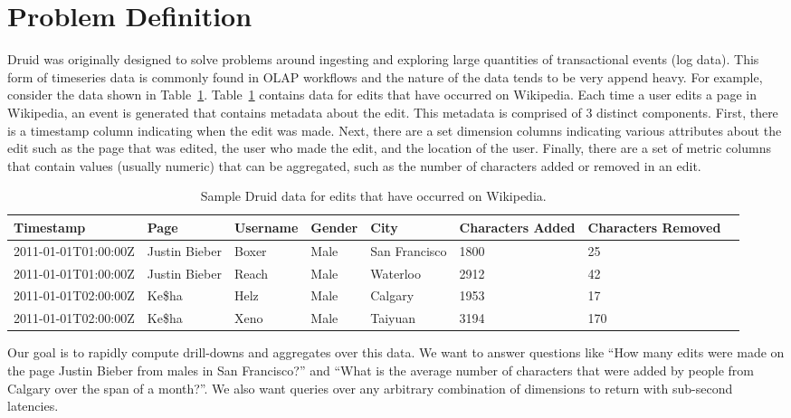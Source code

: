 \documentclass{acm_proc_article-sp}
\begin{document}
\section{Problem Definition}
\label{sec:problem-definition}

Druid was originally designed to solve problems around ingesting and exploring
large quantities of transactional events (log data). This form of timeseries
data is commonly found in OLAP workflows and the nature of the data tends to be
very append heavy. For example, consider the data shown in
Table~\ref{tab:sample_data}.  Table~\ref{tab:sample_data} contains data for
edits that have occurred on Wikipedia. Each time a user edits a page in
Wikipedia, an event is generated that contains metadata about the edit. This
metadata is comprised of 3 distinct components. First, there is a timestamp
column indicating when the edit was made. Next, there are a set dimension
columns indicating various attributes about the edit such as the page that was
edited, the user who made the edit, and the location of the user. Finally,
there are a set of metric columns that contain values (usually numeric) that
can be aggregated, such as the number of characters added or removed in an
edit. 

\begin{table}
  \centering
  \label{tab:sample_data}
  \begin{tabular}{| l | l | l | l | l | l | l | l |}
    \hline
    \textbf{Timestamp} & \textbf{Page} & \textbf{Username} & \textbf{Gender} & \textbf{City} & \textbf{Characters Added} & \textbf{Characters Removed} \\ \hline
    2011-01-01T01:00:00Z & Justin Bieber & Boxer & Male & San Francisco & 1800 & 25 \\ \hline
    2011-01-01T01:00:00Z & Justin Bieber & Reach & Male & Waterloo & 2912 & 42 \\ \hline
    2011-01-01T02:00:00Z & Ke\$ha & Helz & Male & Calgary & 1953 & 17 \\ \hline
    2011-01-01T02:00:00Z & Ke\$ha & Xeno & Male & Taiyuan & 3194 & 170 \\ \hline
  \end{tabular}
  \caption{Sample Druid data for edits that have occurred on Wikipedia.}
\end{table}

Our goal is to rapidly compute drill-downs and aggregates over this data. We
want to answer questions like “How many edits were made on the page Justin
Bieber from males in San Francisco?” and “What is the average number of
characters that were added by people from Calgary over the span of a month?”. We also
want queries over any arbitrary combination of dimensions to return with
sub-second latencies.
\end{document}

